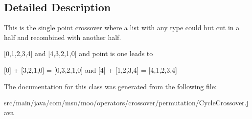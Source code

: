 \subsection{Detailed Description}
This is the single point crossover where a list with any type could but cut in a half and recombined with another half.

\mbox{[}0,1,2,3,4\mbox{]} and \mbox{[}4,3,2,1,0\mbox{]} and point is one leads to

\mbox{[}0\mbox{]} + \mbox{[}3,2,1,0\mbox{]} = \mbox{[}0,3,2,1,0\mbox{]} and \mbox{[}4\mbox{]} + \mbox{[}1,2,3,4\mbox{]} = \mbox{[}4,1,2,3,4\mbox{]} 

The documentation for this class was generated from the following file\-:\begin{DoxyCompactItemize}
\item 
src/main/java/com/msu/moo/operators/crossover/permutation/Cycle\-Crossover.\-java\end{DoxyCompactItemize}
